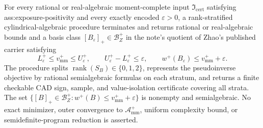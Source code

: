 For every rational or real-algebraic moment-complete input \(\mathfrak I_{\mathrm{cert}}\) satisfying ass:exposure-positivity and every exactly encoded \(\varepsilon>0\), a rank-stratified cylindrical-algebraic procedure terminates and returns rational or real-algebraic bounds and a basis class \([B_\varepsilon]_+\in\mathcal B_Z^+\) in the note's quotient of Zhao's published carrier satisfying
\[
L_\varepsilon^+\le v_{\mathrm{mm}}^+\le U_\varepsilon^+,
\qquad U_\varepsilon^+-L_\varepsilon^+\le\varepsilon,
\qquad w^+(B_\varepsilon)\le v_{\mathrm{mm}}^++\varepsilon.
\]
The procedure splits \(\operatorname{rank}(S_B)\in\{0,1,2\}\), represents the pseudoinverse objective by rational semialgebraic formulas on each stratum, and returns a finite checkable CAD sign, sample, and value-isolation certificate covering all strata.  The set \(\{[B]_+\in\mathcal B_Z^+:w^+(B)\le v_{\mathrm{mm}}^++\varepsilon\}\) is nonempty and semialgebraic.  No exact minimizer, outer convergence to \(\mathcal A_{\mathrm{mm}}^+\), uniform complexity bound, or semidefinite-program reduction is asserted.
